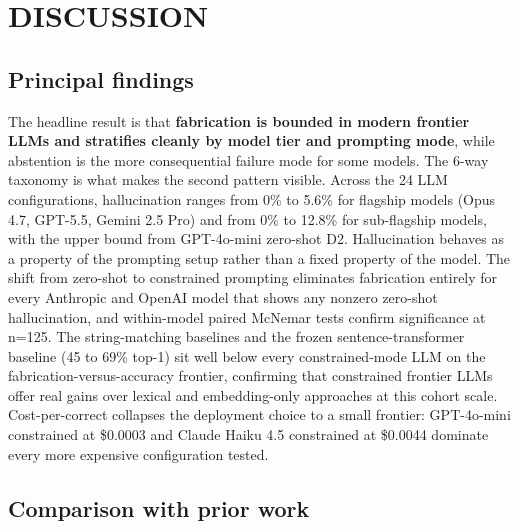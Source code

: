\section{DISCUSSION}\label{discussion}

\subsection{Principal findings}\label{principal-findings}

The headline result is that \textbf{fabrication is bounded in modern
frontier LLMs and stratifies cleanly by model tier and prompting
mode}, while abstention is the more consequential failure mode
for some models. The 6-way taxonomy is what makes the second
pattern visible. Across the 24 LLM configurations, hallucination
ranges from 0\% to 5.6\% for flagship models (Opus 4.7, GPT-5.5,
Gemini 2.5 Pro) and from 0\% to 12.8\% for sub-flagship models, with
the upper bound from GPT-4o-mini zero-shot D2. Hallucination
behaves as a property of the prompting setup rather than a fixed
property of the model. The shift from zero-shot to constrained
prompting eliminates fabrication entirely for every Anthropic and
OpenAI model that shows any nonzero zero-shot hallucination, and
within-model paired McNemar tests confirm significance at n=125.
The string-matching baselines and the frozen sentence-transformer
baseline (45 to 69\% top-1) sit well below every constrained-mode
LLM on the fabrication-versus-accuracy frontier, confirming that
constrained frontier LLMs offer real gains over lexical and
embedding-only approaches at this cohort scale. Cost-per-correct
collapses the deployment choice to a small frontier: GPT-4o-mini
constrained at \$0.0003 and Claude Haiku 4.5 constrained at
\$0.0044 dominate every more expensive configuration tested.

\subsection{Comparison with prior work}\label{comparison-with-prior-work}

